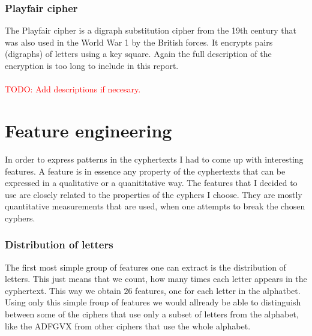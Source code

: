 \documentclass[a4paper]{article}
\begin{document}
\subsubsection*{Playfair cipher}
The Playfair cipher is a digraph substitution cipher from the 19th century that was also used in the World War 1 by the British forces. It encrypts pairs (digraphs) of letters using a key square. Again the full description of the encryption is too long to include in this report.\\
\\
\textcolor{red}{TODO: Add descriptions if necesary.}


\section*{Feature engineering}
In order to express patterns in the cyphertexts I had to come up with interesting features. A feature is in essence any property of the cyphertexts that can be expressed in a qualitative or a quanititative way. The features that I decided to use are closely related to the properties of the cyphers I choose. They are mostly quantitative measurements that are used, when one attempts to break the chosen cyphers.

\subsubsection*{Distribution of letters}
The first most simple group of features one can extract is the distribution of letters. This just means that we count, how many times each letter appears in the cyphertext. This way we obtain $26$ features, one for each letter in the alphatbet. Using only this simple froup of features we would allready be able to distinguish between some of the ciphers that use only a subset of letters from the alphabet, like the ADFGVX from other ciphers that use the whole alphabet.
\end{document}
